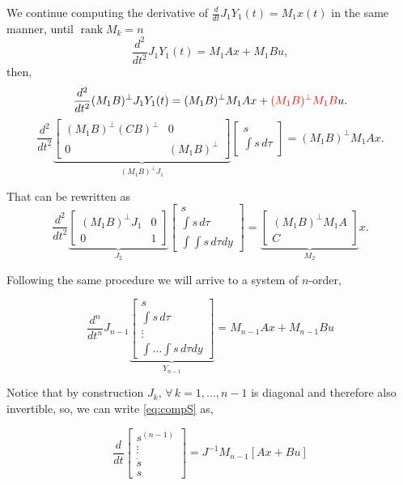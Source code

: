 \documentclass[10pt,letterpaper,twocolumn]{scrartcl}
\DeclareMathOperator{\rank}{rank}
\newcommand{\red}[1]{\textcolor{red}{#1}}
\begin{document}
We continue computing the derivative of $\frac{d}{dt}J_1 Y_1(t) = M_1 x(t)$ in the same manner, until $\rank M_k = n$
\[
    \frac{d^2}{dt^2} J_1 Y_1(t) = M_1 A x + M_1 B u
,\]
\noindent then,
\[
    \frac{d^2}{dt^2} (M_1 B)^\perp J_1 Y_1(t) = (M_1 B)^\perp M_1 A x + \red{(M_1 B)^\perp M_1 B} u
.\]
\[
    \frac{d^2}{dt^2} \underbrace{\begin{bmatrix} (M_1 B)^\perp (C B)^\perp & 0 \\ 0 & (M_1 B)^\perp \end{bmatrix}}_{(M_1 B)^\perp J_1} \begin{bmatrix} s \\ \int s \, d \tau \end{bmatrix}= (M_1 B)^\perp M_1 A x
.\]

That can be rewritten as
\[
    \frac{d^2}{dt^2} \underbrace{\begin{bmatrix} (M_1 B )^\perp J_1 & 0 \\ 0 & 1  \end{bmatrix}}_{J_2}   \begin{bmatrix} s \\ \int s \, d \tau \\ \int \int s \, d \tau dy \end{bmatrix}= \underbrace{\begin{bmatrix}  (M_1 B)^\perp M_1 A \\ C \end{bmatrix}}_{M_2} x
.\]

Following the same procedure we will arrive to a system of $n$-order,

\begin{equation} \label{eq:compS}
    \frac{d^n}{dt^n} J_{n-1} \underbrace{\begin{bmatrix} s \\ \int s \, d \tau \\ \vdots \\ \int \dots \int s \, d \tau dy \end{bmatrix}}_{Y_{n-1}} = M_{n-1} A x + M_{n-1} B u
\end{equation}

Notice that by construction $J_k , \, \forall \, k = 1, \dots , n-1$ is diagonal and therefore also invertible, so, we can write \eqref{eq:compS} as,

\begin{equation}
    \frac{d}{dt}\begin{bmatrix} s^{(n-1)} \\ \vdots \\ \dot{s} \\ s \end{bmatrix} = J^{-1} M_{n-1} \left[ A x + B u \right]
\end{equation}
\end{document}

